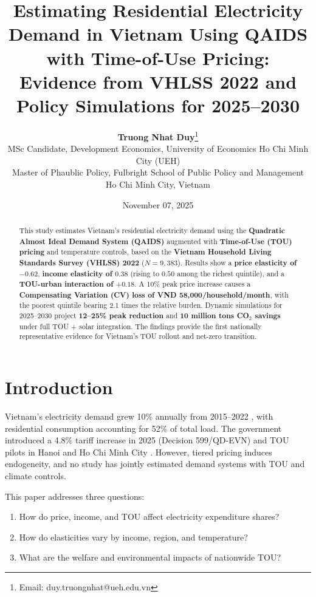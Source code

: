 \documentclass[12pt,a4paper]{article}
\title{\textbf{Estimating Residential Electricity Demand in Vietnam Using QAIDS with Time-of-Use Pricing: Evidence from VHLSS 2022 and Policy Simulations for 2025--2030}}
\author{
	\textbf{Truong Nhat Duy}\thanks{Email: duy.truongnhat@ueh.edu.vn} \\[0.3em]
	\small MSc Candidate, Development Economics, University of Economics Ho Chi Minh City (UEH) \\[-0.2em]
	\small Master of Phaublic Policy, Fulbright School of Public Policy and Management \\[-0.2em]
	\small Ho Chi Minh City, Vietnam
}
\date{November 07, 2025}
\begin{document}
	
	\maketitle
	
	\tableofcontents
	\newpage
	
	\begin{abstract}
		\noindent This study estimates Vietnam's residential electricity demand using the \textbf{Quadratic Almost Ideal Demand System (QAIDS)} augmented with \textbf{Time-of-Use (TOU) pricing} and temperature controls, based on the \textbf{Vietnam Household Living Standards Survey (VHLSS) 2022} ($N=9{,}383$). Results show a \textbf{price elasticity of $-0.62$}, \textbf{income elasticity of $0.38$} (rising to $0.50$ among the richest quintile), and a \textbf{TOU-urban interaction of $+0.18$}. A 10\% peak price increase causes a \textbf{Compensating Variation (CV) loss of VND 58,000/household/month}, with the poorest quintile bearing 2.1 times the relative burden. Dynamic simulations for 2025--2030 project \textbf{12--25\% peak reduction} and \textbf{10 million tons CO$_2$ savings} under full TOU + solar integration. The findings provide the first nationally representative evidence for Vietnam's TOU rollout and net-zero transition.
	\end{abstract}
	
	\section{Introduction}
	Vietnam's electricity demand grew 10\% annually from 2015--2022 \citep{gso2024}, with residential consumption accounting for 52\% of total load. The government introduced a 4.8\% tariff increase in 2025 (Decision 599/QD-EVN) and TOU pilots in Hanoi and Ho Chi Minh City \citep{evn2025}. However, tiered pricing induces endogeneity, and no study has jointly estimated demand systems with TOU and climate controls.
	
	This paper addresses three questions:
	\begin{enumerate}
		\item How do price, income, and TOU affect electricity expenditure shares?
		\item How do elasticities vary by income, region, and temperature?
		\item What are the welfare and environmental impacts of nationwide TOU?
	\end{enumerate}
	
\end{document}
